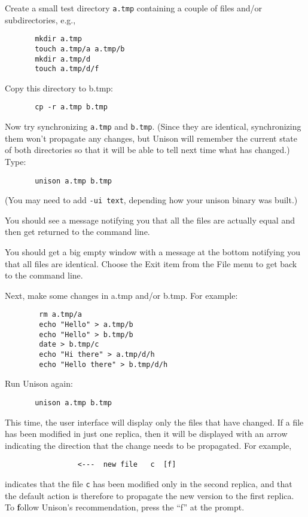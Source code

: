 \documentclass{article}
\begin{document}
Create a small test directory {\tt a.tmp} containing a couple of files
and/or subdirectories, e.g.,
\begin{verbatim}
       mkdir a.tmp
       touch a.tmp/a a.tmp/b
       mkdir a.tmp/d
       touch a.tmp/d/f
\end{verbatim}
Copy this directory to b.tmp:
\begin{verbatim}
       cp -r a.tmp b.tmp
\end{verbatim}

Now try synchronizing {\tt a.tmp} and {\tt b.tmp}.  (Since they are
identical, synchronizing them won't propagate any changes, but Unison
will remember the current state of both directories so that it will be
able to tell next time what has changed.)  Type:
\begin{verbatim}
       unison a.tmp b.tmp
\end{verbatim}
(You may need to add \verb|-ui text|, depending how your unison binary was built.)

\begin{textui}
You should see a message notifying you that all the files are actually
equal and then get returned to the command line.
\end{textui}

\begin{tkui}
You should get a big empty window with a message at the bottom
notifying you that all files are identical.  Choose the Exit item from
the File menu to get back to the command line.
\end{tkui}

Next, make some changes in a.tmp and/or b.tmp.  For example:
\begin{verbatim}
        rm a.tmp/a
        echo "Hello" > a.tmp/b
        echo "Hello" > b.tmp/b
        date > b.tmp/c
        echo "Hi there" > a.tmp/d/h
        echo "Hello there" > b.tmp/d/h
\end{verbatim}
Run Unison again:
\begin{verbatim}
       unison a.tmp b.tmp
\end{verbatim}

This time, the user interface will display only the files that have
changed.  If a file has been modified in just one
replica, then it will be displayed with an arrow indicating the
direction that the change needs to be propagated.  For example,
\begin{verbatim}
                 <---  new file   c  [f]
\end{verbatim}
\noindent
indicates that the file {\tt c} has been modified only in the second
replica, and that the default action is therefore to propagate the new
version to the first replica.  To {\bf f}ollow Unison's recommendation,
press the ``f'' at the prompt.
\end{document}
